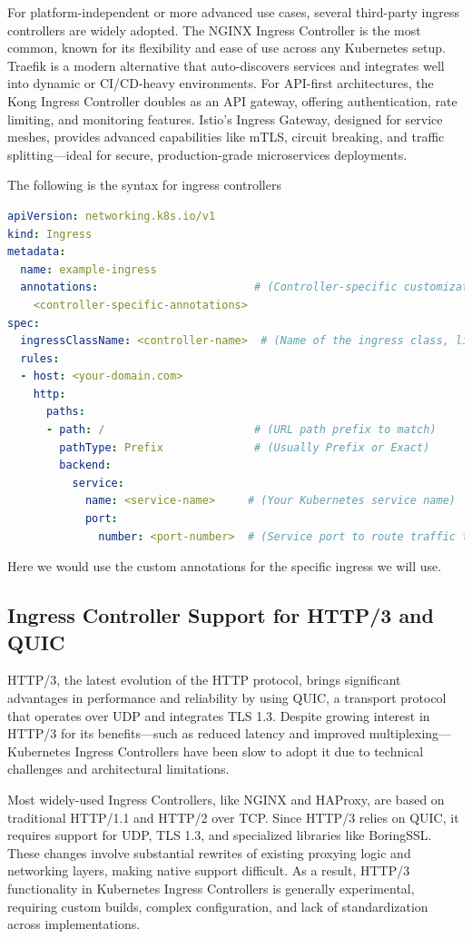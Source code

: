 For platform-independent or more advanced use cases, several third-party ingress controllers are widely adopted. The NGINX Ingress Controller is the most common, known for its flexibility and ease of use across any Kubernetes setup. Traefik is a modern alternative that auto-discovers services and integrates well into dynamic or CI/CD-heavy environments. For API-first architectures, the Kong Ingress Controller doubles as an API gateway, offering authentication, rate limiting, and monitoring features. Istio's Ingress Gateway, designed for service meshes, provides advanced capabilities like mTLS, circuit breaking, and traffic splitting—ideal for secure, production-grade microservices deployments.

The following is the syntax for ingress controllers
\begin{lstlisting}[language=yaml]
apiVersion: networking.k8s.io/v1
kind: Ingress
metadata:
  name: example-ingress
  annotations:                        # (Controller-specific customizations go here)
    <controller-specific-annotations>
spec:
  ingressClassName: <controller-name>  # (Name of the ingress class, like nginx, alb, kong)
  rules:
  - host: <your-domain.com>
    http:
      paths:
      - path: /                       # (URL path prefix to match)
        pathType: Prefix              # (Usually Prefix or Exact)
        backend:
          service:
            name: <service-name>     # (Your Kubernetes service name)
            port:
              number: <port-number>  # (Service port to route traffic to)
\end{lstlisting}
Here we would use the custom annotations for the specific ingress we will use.


\subsection{Ingress Controller Support for HTTP/3 and QUIC}
HTTP/3, the latest evolution of the HTTP protocol, brings significant advantages in performance and reliability by using QUIC, a transport protocol that operates over UDP and integrates TLS 1.3. Despite growing interest in HTTP/3 for its benefits—such as reduced latency and improved multiplexing—Kubernetes Ingress Controllers have been slow to adopt it due to technical challenges and architectural limitations.

Most widely-used Ingress Controllers, like NGINX and HAProxy, are based on traditional HTTP/1.1 and HTTP/2 over TCP. Since HTTP/3 relies on QUIC, it requires support for UDP, TLS 1.3, and specialized libraries like BoringSSL. These changes involve substantial rewrites of existing proxying logic and networking layers, making native support difficult. As a result, HTTP/3 functionality in Kubernetes Ingress Controllers is generally experimental, requiring custom builds, complex configuration, and lack of standardization across implementations.


